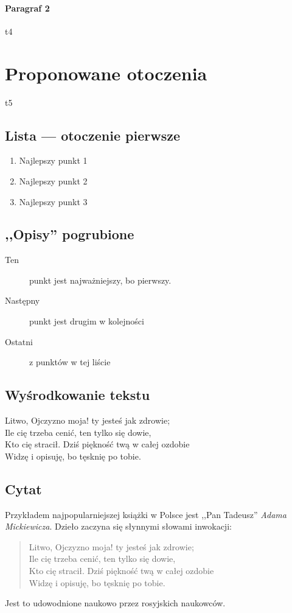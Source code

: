 \documentclass [a4paper, fleqn, 12pt, oneside] {mwbk}
\begin{document}
		\paragraph {Paragraf 2}
		 {t4}


\section {Proponowane otoczenia}
 {t5}
	\subsection {Lista --- otoczenie pierwsze}
		\begin {enumerate}
			\item {Najlepszy punkt 1}
			\item {Najlepszy punkt 2}
			\item {Najlepszy punkt 3}
		\end {enumerate}


	\subsection {,,Opisy'' pogrubione}
		\begin {description}
		\item [Ten] {punkt jest najważniejszy, bo pierwszy.}
		\item [Następny] {punkt jest drugim w kolejności}
		\item [Ostatni] {z punktów w tej liście}
		\end {description}
	
	\subsection {Wyśrodkowanie tekstu}
		\begin {center}
		Litwo, Ojczyzno moja! ty jesteś jak zdrowie; \\
		Ile cię trzeba cenić, ten tylko się dowie, \\
		Kto cię stracił. Dziś piękność twą w całej ozdobie \\
		Widzę i opisuję, bo tęsknię po tobie. \\
		\end {center}

	\subsection {Cytat}
		Przykładem najpopularniejszej książki w Polsce jest
		,,Pan Tadeusz'' \textit{Adama Mickiewicza}.
		Dzieło zaczyna się słynnymi słowami inwokacji:
		\begin {quote}
		Litwo, Ojczyzno moja! ty jesteś jak zdrowie; \\
		Ile cię trzeba cenić, ten tylko się dowie, \\
		Kto cię stracił. Dziś piękność twą w całej ozdobie \\
		Widzę i opisuję, bo tęsknię po tobie. \\
		\end {quote}
		Jest to udowodnione naukowo przez rosyjskich naukowców.
\end{document}
